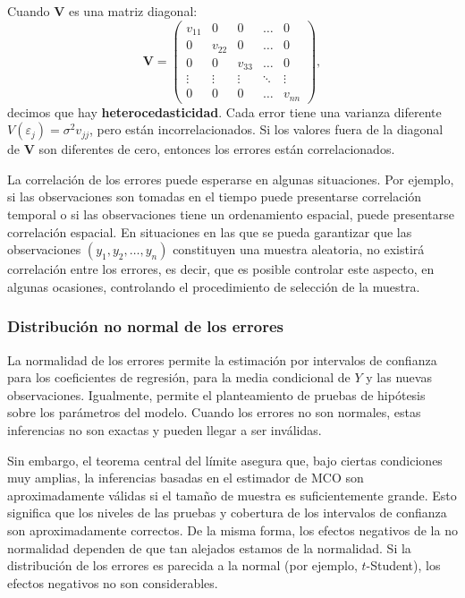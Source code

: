 \documentclass[
]{article}
\begin{document}
Cuando \(\boldsymbol V\) es una matriz diagonal:
\[
\boldsymbol V= \begin{pmatrix}
v_{11} & 0 & 0 & \ldots & 0 \\
0 & v_{22} & 0 & \ldots & 0 \\
0 & 0 & v_{33} & \ldots & 0 \\
\vdots & \vdots & \vdots & \ddots & \vdots \\
0 & 0 & 0 & \ldots & v_{nn}
\end{pmatrix},
\]
decimos que hay \textbf{heterocedasticidad}. Cada error tiene una varianza diferente \(V(\varepsilon_{j})=\sigma^{2}v_{jj}\), pero están incorrelacionados. Si los valores fuera de la diagonal de \(\boldsymbol V\) son diferentes de cero, entonces los errores están correlacionados.

La correlación de los errores puede esperarse en algunas situaciones. Por ejemplo, si las observaciones son tomadas en el tiempo puede presentarse correlación temporal o si las observaciones tiene un ordenamiento espacial, puede presentarse correlación espacial. En situaciones en las que se pueda garantizar que las observaciones \((y_{1},y_{2},\ldots,y_{n})\) constituyen una muestra aleatoria, no existirá correlación entre los errores, es decir, que es posible controlar este aspecto, en algunas ocasiones, controlando el procedimiento de selección de la muestra.

\subsubsection{Distribución no normal de los errores}\label{distribuciuxf3n-no-normal-de-los-errores}

La normalidad de los errores permite la estimación por intervalos de confianza para los coeficientes de regresión, para la media condicional de \(Y\) y las nuevas observaciones. Igualmente, permite el planteamiento de pruebas de hipótesis sobre los parámetros del modelo. Cuando los errores no son normales, estas inferencias no son exactas y pueden llegar a ser inválidas.

Sin embargo, el teorema central del límite asegura que, bajo ciertas condiciones muy amplias, la inferencias basadas en el estimador de MCO son aproximadamente válidas si el tamaño de muestra es suficientemente grande. Esto significa que los niveles de las pruebas y cobertura de los intervalos de confianza son aproximadamente correctos.
De la misma forma, los efectos negativos de la no normalidad dependen de que tan alejados estamos de la normalidad. Si la distribución de los errores es parecida a la normal (por ejemplo, \(t\)-Student), los efectos negativos no son considerables.
\end{document}
